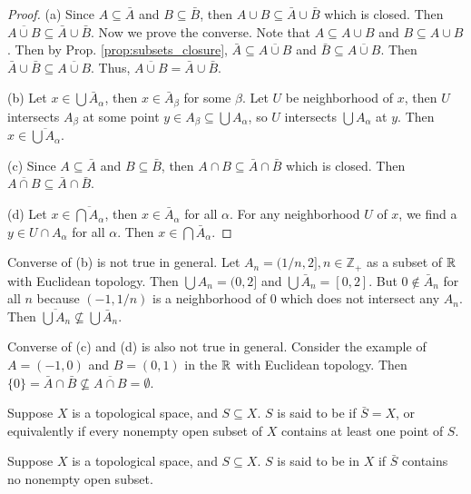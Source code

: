 \documentclass[11pt,a4paper]{article}
\begin{document}
\begin{proof}
(a) Since $A\subseteq \bar{A}$ and $B\subseteq \bar{B}$, then $A\cup B\subseteq \bar{A}\cup \bar{B}$ which is closed. Then $\overline{A\cup B}\subseteq \bar{A}\cup\bar{B}$. Now we prove the converse. Note that $A\subseteq A\cup B$ and $B\subseteq A\cup B$. Then by Prop. \ref{prop:subsets_closure}, $\bar{A}\subseteq \overline{A\cup B}$ and $\bar{B}\subseteq \overline{A\cup B}$. Then $\bar{A}\cup\bar{B}\subseteq \overline{A\cup B}$. Thus, $\overline{A\cup B} = \bar{A}\cup \bar{B}$.

\noindent(b) Let $x\in \bigcup \bar{A}_\alpha$, then $x\in \bar{A}_\beta$ for some $\beta$. Let $U$ be neighborhood of $x$, then $U$ intersects $A_\beta$ at some point $y\in A_\beta\subseteq \bigcup A_\alpha$, so $U$ intersects $\bigcup A_\alpha$ at $y$. Then $x\in \overline{\bigcup A_\alpha}$.

\noindent(c) Since $A\subseteq \bar{A}$ and $B\subseteq \bar{B}$, then $A\cap B\subseteq \bar{A}\cap \bar{B}$ which is closed. Then $\overline{A\cap B}\subseteq \bar{A}\cap\bar{B}$.

\noindent(d) Let $x\in \overline{\bigcap A_\alpha}$, then $x\in \bar{A}_\alpha$ for all $\alpha$. For any neighborhood $U$ of $x$, we find a $y\in U\cap A_\alpha$ for all $\alpha$. Then $x\in \bigcap \bar{A}_\alpha$.
\end{proof}

\begin{remark}
Converse of (b) is not true in general. Let $A_n = (1/n,2], n\in \mathbb{Z}_+$ as a subset of $\mathbb{R}$ with Euclidean topology. Then $\bigcup A_n = (0,2]$ and $\bigcup \bar{A}_n = [0,2]$. 
But $0\notin \bar{A}_n$ for all $n$ because $(-1,1/n)$ is a neighborhood of $0$ which does not intersect any $A_n$. 
Then $\overline{\bigcup A_n}\nsubseteq \bigcup\bar{A}_n$.

\noindent Converse of (c) and (d) is also not true in general. Consider the example of $A = (-1,0)$ and $B = (0,1)$ in the $\mathbb{R}$ with Euclidean topology. Then $\{0\} = \bar{A}\cap\bar{B} \nsubseteq \overline{A\cap B} = \emptyset$.
\end{remark}

\begin{definition}
Suppose $X$ is a topological space, and $S\subseteq X$. $S$ is said to be  if $\bar{S}=X$, or equivalently if every nonempty open subset of $X$ contains at least one point of $S$.
\end{definition}

\begin{definition}
Suppose $X$ is a topological space, and $S\subseteq X$. $S$ is said to be  in ${X}$ if $\bar{S}$ contains no nonempty open subset.
\end{definition}
\end{document}
